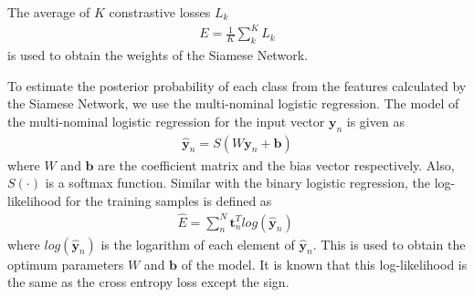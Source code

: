 \documentclass[runningheads,a4paper]{llncs}
\begin{document}
The average of $K$ constrastive losses $L_k$  
\begin{align} \label{eq:ave contrastive}
E = \frac{1}{K}\sum_{k}^{K}L_k
\end{align}
is used to obtain the weights of the Siamese Network.

To estimate the posterior probability of each class from the features calculated by the Siamese Network, we use the multi-nominal logistic regression.
The model of the multi-nominal logistic regression for the input vector $\bm{y}_n$ is given as
\begin{align} \label{eq:regression multi}
    \hat{\bm y}_n = S(W\bm{y}_n+\bm{b})
\end{align}
where $W$ and $\bm{b}$ are the coefficient matrix and the bias vector respectively.
Also, $S(\cdot)$ is a softmax function.
Similar with the binary logistic regression, the log-likelihood for the training samples is defined as
\begin{align} \label{eq:multi crossentropy}
\hat{E} = \sum_n^N {\bm t}_n^Tlog(\hat{\bm y}_n) \; 
\end{align}
where $log(\hat{\bm y}_n)$ is the logarithm of each element of $\hat{\bm y}_n$. 
This is used to obtain the optimum parameters $W$ and $\bm{b}$ of the model.
It is known that this log-likelihood is the same as the cross entropy loss except the sign.
\end{document}
